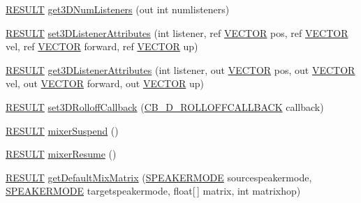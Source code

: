 \begin{DoxyCompactItemize}
\item 
\hyperlink{namespace_f_m_o_d_a305d1176ef3f8c8815861a60407ac33d}{R\+E\+S\+U\+LT} \hyperlink{class_f_m_o_d_1_1_system_a281e46008eeece8d0ac11023d3755e47}{get3\+D\+Num\+Listeners} (out int numlisteners)
\item 
\hyperlink{namespace_f_m_o_d_a305d1176ef3f8c8815861a60407ac33d}{R\+E\+S\+U\+LT} \hyperlink{class_f_m_o_d_1_1_system_afc94ed4c6743f833f61ad913aea43a3a}{set3\+D\+Listener\+Attributes} (int listener, ref \hyperlink{struct_f_m_o_d_1_1_v_e_c_t_o_r}{V\+E\+C\+T\+OR} pos, ref \hyperlink{struct_f_m_o_d_1_1_v_e_c_t_o_r}{V\+E\+C\+T\+OR} vel, ref \hyperlink{struct_f_m_o_d_1_1_v_e_c_t_o_r}{V\+E\+C\+T\+OR} forward, ref \hyperlink{struct_f_m_o_d_1_1_v_e_c_t_o_r}{V\+E\+C\+T\+OR} up)
\item 
\hyperlink{namespace_f_m_o_d_a305d1176ef3f8c8815861a60407ac33d}{R\+E\+S\+U\+LT} \hyperlink{class_f_m_o_d_1_1_system_a2d46640c7c6a7d6e47caf201d2169a11}{get3\+D\+Listener\+Attributes} (int listener, out \hyperlink{struct_f_m_o_d_1_1_v_e_c_t_o_r}{V\+E\+C\+T\+OR} pos, out \hyperlink{struct_f_m_o_d_1_1_v_e_c_t_o_r}{V\+E\+C\+T\+OR} vel, out \hyperlink{struct_f_m_o_d_1_1_v_e_c_t_o_r}{V\+E\+C\+T\+OR} forward, out \hyperlink{struct_f_m_o_d_1_1_v_e_c_t_o_r}{V\+E\+C\+T\+OR} up)
\item 
\hyperlink{namespace_f_m_o_d_a305d1176ef3f8c8815861a60407ac33d}{R\+E\+S\+U\+LT} \hyperlink{class_f_m_o_d_1_1_system_a9bc9ee43ccce64e90626067723534f6b}{set3\+D\+Rolloff\+Callback} (\hyperlink{namespace_f_m_o_d_a6b260b8987f86dc39a7bc6978e080fc3}{C\+B\+\_\+D\+\_\+\+R\+O\+L\+L\+O\+F\+F\+C\+A\+L\+L\+B\+A\+CK} callback)
\item 
\hyperlink{namespace_f_m_o_d_a305d1176ef3f8c8815861a60407ac33d}{R\+E\+S\+U\+LT} \hyperlink{class_f_m_o_d_1_1_system_a441d25d4b895da6e81e0cf65845c984b}{mixer\+Suspend} ()
\item 
\hyperlink{namespace_f_m_o_d_a305d1176ef3f8c8815861a60407ac33d}{R\+E\+S\+U\+LT} \hyperlink{class_f_m_o_d_1_1_system_a3351b73b749f572057e24a1ff069ef34}{mixer\+Resume} ()
\item 
\hyperlink{namespace_f_m_o_d_a305d1176ef3f8c8815861a60407ac33d}{R\+E\+S\+U\+LT} \hyperlink{class_f_m_o_d_1_1_system_a7743f89e5cfb3d695bba2f280e8a3de9}{get\+Default\+Mix\+Matrix} (\hyperlink{namespace_f_m_o_d_aa0732e7e8efd3b96b526a7f2f8479634}{S\+P\+E\+A\+K\+E\+R\+M\+O\+DE} sourcespeakermode, \hyperlink{namespace_f_m_o_d_aa0732e7e8efd3b96b526a7f2f8479634}{S\+P\+E\+A\+K\+E\+R\+M\+O\+DE} targetspeakermode, float\mbox{[}$\,$\mbox{]} matrix, int matrixhop)
\item 

\end{DoxyCompactItemize}
